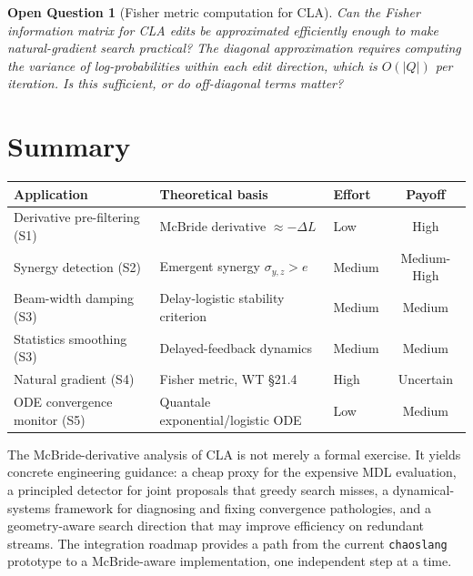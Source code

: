 \documentclass[11pt]{article}
\newtheorem{openquestion}{Open Question}
\begin{document}
\begin{openquestion}[Fisher metric computation for CLA]
Can the Fisher information matrix for CLA edits be approximated efficiently enough to make natural-gradient search practical?  The diagonal approximation requires computing the variance of log-probabilities within each edit direction, which is $O(|Q|)$ per iteration.  Is this sufficient, or do off-diagonal terms matter?
\end{openquestion}

\section{Summary}

\begin{center}
\begin{tabular}{|l|l|l|c|}
\hline
\textbf{Application} & \textbf{Theoretical basis} & \textbf{Effort} & \textbf{Payoff} \\
\hline
Derivative pre-filtering (S1) & McBride derivative $\approx -\Delta L$ & Low & High \\
Synergy detection (S2) & Emergent synergy $\sigma_{y,z} > e$ & Medium & Medium-High \\
Beam-width damping (S3) & Delay-logistic stability criterion & Medium & Medium \\
Statistics smoothing (S3) & Delayed-feedback dynamics & Medium & Medium \\
Natural gradient (S4) & Fisher metric, WT \S 21.4 & High & Uncertain \\
ODE convergence monitor (S5) & Quantale exponential/logistic ODE & Low & Medium \\
\hline
\end{tabular}
\end{center}

The McBride-derivative analysis of CLA is not merely a formal exercise.  It yields concrete engineering guidance: a cheap proxy for the expensive MDL evaluation, a principled detector for joint proposals that greedy search misses, a dynamical-systems framework for diagnosing and fixing convergence pathologies, and a geometry-aware search direction that may improve efficiency on redundant streams.  The integration roadmap provides a path from the current \texttt{chaoslang} prototype to a McBride-aware implementation, one independent step at a time.
\end{document}
